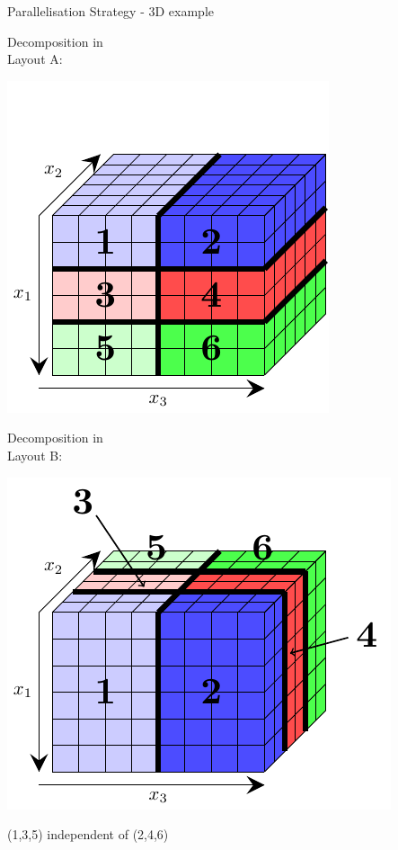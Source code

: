 \documentclass{beamer}
\begin{document}
\begin{frame}{Parallelisation Strategy - 3D example}
 \begin{minipage}[b]{.4\textwidth}
 Decomposition in\\ Layout A:
 
  \includegraphics[width=\textwidth]{Parallel3d/End}
 \end{minipage}
 \hspace{.05\textwidth}
 \begin{minipage}[b]{.48\textwidth}
  Decomposition in\\ Layout B:
 
  \includegraphics[width=\textwidth]{Parallel3d/End2}
 \end{minipage}
 
 (1,3,5) independent of (2,4,6)
\end{frame}
\end{document}
